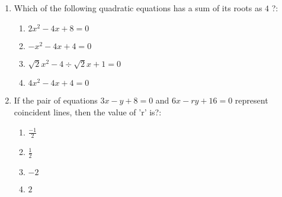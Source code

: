 \begin{enumerate}                                                              
\item Which of the following quadratic equations has a sum of its roots as  $4$ ?:  
\begin{enumerate}
\item $ 2x^2 - 4x + 8 = 0 $                          
\item $ -x^2 - 4x + 4 = 0 $                          
\item $ \sqrt{2}x^2 - 4 \div \sqrt{2}x + 1 = 0 $
\item $ 4x^2 - 4x + 4 = 0 $
\end{enumerate}
\item If the pair of equations $3x - y + 8 = 0$ and $6x - ry + 16 = 0$ represent coincident lines, then the value of 'r' is?:                          
\begin{enumerate}        
\item $ \frac{-1}{2} $                        
\item $ \frac{1}{2} $                        
\item $ -2 $      
\item $ 2 $
\end{enumerate}	
\end{enumerate}
